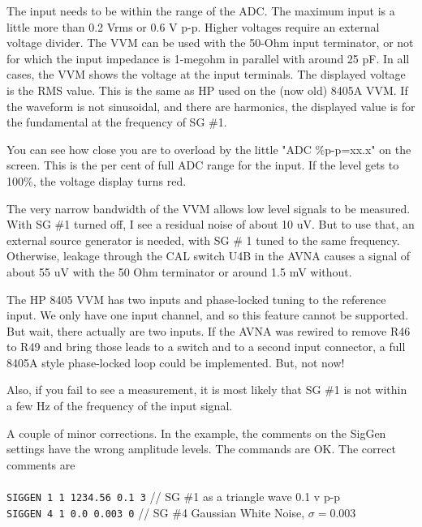 The input needs to be within the range of the ADC. The maximum input is a little more than 0.2 Vrms or 0.6 V p-p.  Higher voltages require an external voltage divider.  The VVM can be used with the 50-Ohm input terminator, or not for which the input impedance is 1-megohm in parallel with around 25 pF.  In all cases, the VVM shows the voltage at the input terminals.  The displayed voltage is the RMS value.  This is the same as HP used on the (now  old) 8405A VVM.   If the waveform is not sinusoidal, and there are harmonics, the displayed value is for the fundamental at the frequency of SG \#1.

You can see how close you are to overload by the little "ADC \%p-p=xx.x" on the screen.  This is the per cent of full ADC range for  the input.  If the level gets to 100\%, the voltage display turns red.

The very narrow bandwidth of the VVM allows low level signals to be measured.  With SG \#1 turned off, I see a residual noise of about 10 uV.  But to use that, an external source generator is needed, with SG \# 1 tuned to the same frequency.  Otherwise, leakage through the CAL switch U4B in the AVNA causes a signal of about 55 uV with the 50 Ohm terminator or around 1.5 mV without.

The HP 8405 VVM has two inputs and phase-locked tuning to the reference input.  We only have one input channel, and so this feature cannot be supported.  But wait, there actually are two inputs.  If the AVNA was rewired to remove R46 to R49 and bring those leads to a switch and to a second input connector, a full 8405A style phase-locked loop could be implemented.  But, not now!

Also, if you fail to see a measurement, it is most likely that SG \#1 is not within a few Hz of the frequency of the input signal.

A couple of minor corrections.  In the example, the comments on the SigGen settings have the wrong amplitude levels.   The commands are OK.  The correct comments are \\ \\
 \texttt{SIGGEN 1 1 1234.56 0.1 3}  // SG \#1 as a triangle wave 0.1 v p-p \\
 \texttt{SIGGEN 4 1 0.0 0.003 0}  // SG \#4 Gaussian White Noise, $\sigma = 0.003$\\
